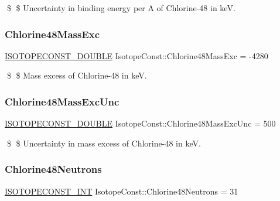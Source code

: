 \$ \$ Uncertainty in binding energy per A of Chlorine-\/48 in keV. \mbox{\label{group___isotope_const-_chlorine-_cl48_gab36fe6087889e0ae6820d8c0ca6ce352}} 
\subsubsection{\texorpdfstring{Chlorine48\+Mass\+Exc}{Chlorine48MassExc}}
{\footnotesize\ttfamily \mbox{\hyperlink{group___isotope_const-_macros_ga8f45a7272ce02c0b4c65c44636ed719a}{I\+S\+O\+T\+O\+P\+E\+C\+O\+N\+S\+T\+\_\+\+D\+O\+U\+B\+LE}} Isotope\+Const\+::\+Chlorine48\+Mass\+Exc = -\/4280}

\$ \$ Mass excess of Chlorine-\/48 in keV. \mbox{\label{group___isotope_const-_chlorine-_cl48_ga9ce600a9fb08e8494c1886373e705005}} 
\subsubsection{\texorpdfstring{Chlorine48\+Mass\+Exc\+Unc}{Chlorine48MassExcUnc}}
{\footnotesize\ttfamily \mbox{\hyperlink{group___isotope_const-_macros_ga8f45a7272ce02c0b4c65c44636ed719a}{I\+S\+O\+T\+O\+P\+E\+C\+O\+N\+S\+T\+\_\+\+D\+O\+U\+B\+LE}} Isotope\+Const\+::\+Chlorine48\+Mass\+Exc\+Unc = 500}

\$ \$ Uncertainty in mass excess of Chlorine-\/48 in keV. \mbox{\label{group___isotope_const-_chlorine-_cl48_ga610d09693ca60f4d1252bad999849c6f}} 
\subsubsection{\texorpdfstring{Chlorine48\+Neutrons}{Chlorine48Neutrons}}
{\footnotesize\ttfamily \mbox{\hyperlink{group___isotope_const-_macros_ga5f18360b3e99483a35c32d789e62621c}{I\+S\+O\+T\+O\+P\+E\+C\+O\+N\+S\+T\+\_\+\+I\+NT}} Isotope\+Const\+::\+Chlorine48\+Neutrons = 31}

